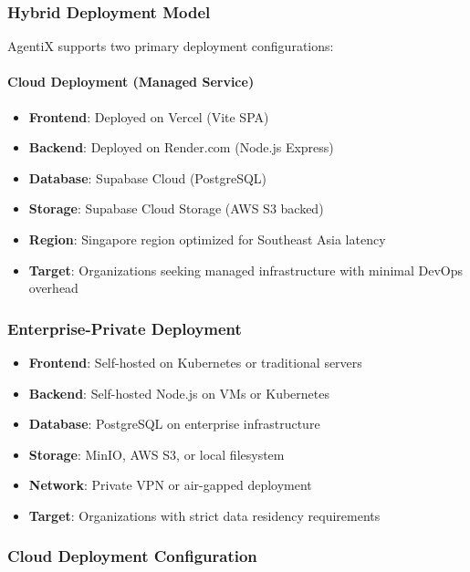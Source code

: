 \documentclass[12pt,oneside,openright,a4paper]{cpe-english-project}
\begin{document}
\subsubsection{Hybrid Deployment Model}

AgentiX supports two primary deployment configurations:

\paragraph{Cloud Deployment (Managed Service)}

\begin{itemize}
    \item \textbf{Frontend}: Deployed on Vercel (Vite SPA)
    \item \textbf{Backend}: Deployed on Render.com (Node.js Express)
    \item \textbf{Database}: Supabase Cloud (PostgreSQL)
    \item \textbf{Storage}: Supabase Cloud Storage (AWS S3 backed)
    \item \textbf{Region}: Singapore region optimized for Southeast Asia latency
    \item \textbf{Target}: Organizations seeking managed infrastructure with minimal DevOps overhead
\end{itemize}

\subsubsection{Enterprise-Private Deployment}

\begin{itemize}
    \item \textbf{Frontend}: Self-hosted on Kubernetes or traditional servers
    \item \textbf{Backend}: Self-hosted Node.js on VMs or Kubernetes
    \item \textbf{Database}: PostgreSQL on enterprise infrastructure
    \item \textbf{Storage}: MinIO, AWS S3, or local filesystem
    \item \textbf{Network}: Private VPN or air-gapped deployment
    \item \textbf{Target}: Organizations with strict data residency requirements
\end{itemize}

\subsubsection{Cloud Deployment Configuration}
\end{document}
